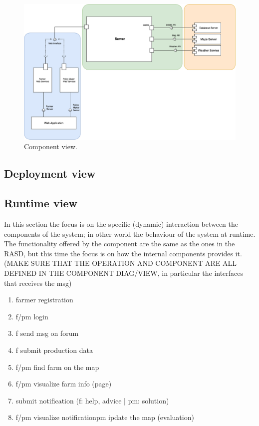 \begin{figure}[H]
    \begin{center}
    \includegraphics[width=1.2\textwidth]{images/Component2.png}
    \caption{Component view.}
    \label{fig:component view2}
    \end{center}
\end{figure}

\subsection{Deployment view}

\subsection{Runtime view}

In this section the focus is on the specific (dynamic) interaction between the components of the system; in other world the behaviour of the system at runtime.
The functionality offered by the component are the same as the ones in the RASD, but this time the focus is on how the internal components provides it.
(MAKE SURE THAT THE OPERATION AND COMPONENT ARE ALL DEFINED IN THE COMPONENT DIAG/VIEW, in particular the interfaces that receives the msg)

\begin{enumerate}
    \item farmer registration
    \item f/pm login
    \item f send msg on forum
    \item f submit production data
    \item f/pm find farm on the map
    \item f/pm visualize farm info (page)
    \item submit notification (f: help, advice | pm: solution)
    \item f/pm visualize notificationpm ipdate the map (evaluation)
\end{enumerate}


